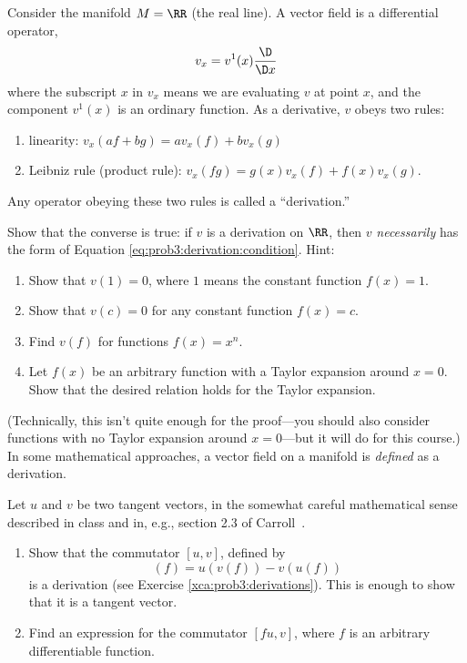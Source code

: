 \begin{xca}[Derivations]\label{xca:prob3:derivations}
Consider the manifold $M=\RR$ (the real line). A vector field is
a differential operator,
\begin{equation}\label{eq:prob3:derivation:condition}
v_{x}=v^{1}(x)\frac{\D}{\D x}
\end{equation}
where the subscript $x$ in $v_x$ means we are evaluating $v$ at point $x$, and the component $v^1 (x)$ is an ordinary function. As a derivative, $v$ obeys two rules:
\begin{enumerate}
\item linearity: $v_x (af + bg) = av_x (f ) + bv_x (g)$
\item Leibniz rule (product rule): $v_x (f g) = g(x)v_x (f ) + f (x)v_x (g)$.
\end{enumerate}
Any operator obeying these two rules is called a ``derivation.''

Show that the converse is true: if $v$ is a derivation on $\RR$,
then $v$ \emph{necessarily} has the form of Equation
\eqref{eq:prob3:derivation:condition}. Hint:
\begin{enumerate}
\item Show that $v(1) = 0$, where $1$ means the constant function $f (x) = 1$.
\item Show that $v(c) = 0$ for any constant function $f (x) = c$.
\item Find $v(f)$ for functions $f (x) = x^n$.
\item Let $f (x)$ be an arbitrary function with a Taylor expansion around $x = 0$. Show that the desired relation holds for the Taylor expansion.
\end{enumerate}
(Technically, this isn't quite enough for the proof---you should
also consider functions with no Taylor expansion around $x =
0$---but it will do for this course.) In some mathematical
approaches, a vector field on a manifold is \emph{defined} as a
derivation.
\end{xca}
\begin{xca}[Commutators]\label{xca:prob3:commutators}
Let $u$ and $v$ be two tangent vectors, in the somewhat careful
mathematical sense described in class and in, e.g., section 2.3
of Carroll~\cite{Carroll:2004st}. 
\begin{enumerate}
\item Show that the commutator $[u, v]$, defined by
\begin{equation}
[u, v](f) = u(v(f)) - v(u(f))
\end{equation}
is a derivation (see Exercise \ref{xca:prob3:derivations}). This
is enough to show that it is a tangent vector. 
\item\label{xca:prob3:commutator:firstSlot} Find an expression for the commutator $[f u, v]$, where $f$
  is an arbitrary differentiable function. 
\end{enumerate}
\end{xca}
